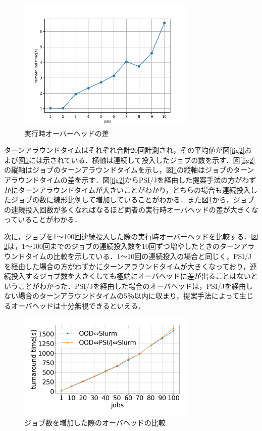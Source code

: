 \documentclass[a4paper,oneside,twocolumn,notitlepage,dvipdfmx]{jsarticle}
\begin{document}
\begin{figure}[h]
  \centering
  \hspace{-11mm}
  \includegraphics[width=85mm]{./fig/ave_diff_1-20.png}
  \vspace{-10pt}
  \caption{実行時オーバーヘッドの差}
  \label{fig3}
\end{figure}

\vspace{3\baselineskip}
ターンアラウンドタイムはそれぞれ合計20回計測され，その平均値が図\ref{fig2}および図\ref{fig3}には示されている．横軸は連続して投入したジョブの数を示す．図\ref{fig2}の縦軸はジョブのターンアラウンドタイムを示し，図\ref{fig3}の縦軸はジョブのターンアラウンドタイムの差を示す．図\ref{fig2}からPSI/Jを経由した提案手法の方がわずかにターンアラウンドタイムが大きいことがわかり，どちらの場合も連続投入したジョブの数に線形比例して増加していることがわかる．また図\ref{fig3}から，ジョブの連続投入回数が多くなればなるほど両者の実行時オーバヘッドの差が大きくなっていることがわかる．\par
次に，ジョブを1～100回連続投入した際の実行時オーバーヘッドを比較する．図\ref{fig5}は，1～100回までのジョブの連続投入数を10回ずつ増やしたときのターンアラウンドタイムの比較を示している．1～10回の連続投入の場合と同じく，PSI/Jを経由した場合の方がわずかにターンアラウンドタイムが大きくなっており，連続投入するジョブ数を大きくしても極端にオーバヘッドに差が出ることはないということがわかった．PSI/Jを経由した場合のオーバヘッドは，PSI/Jを経由しない場合のターンアラウンドタイムの5％以内に収まり，提案手法によって生じるオーバヘッドは十分無視できるといえる．\par

\begin{figure}[h]
  \centering
  \hspace{-11mm}
  \includegraphics[width=85mm]{./fig/100jobs.png}
  \vspace{-10pt}
  \caption{ジョブ数を増加した際のオーバヘッドの比較}
  \label{fig5}
\end{figure}
\end{document}

